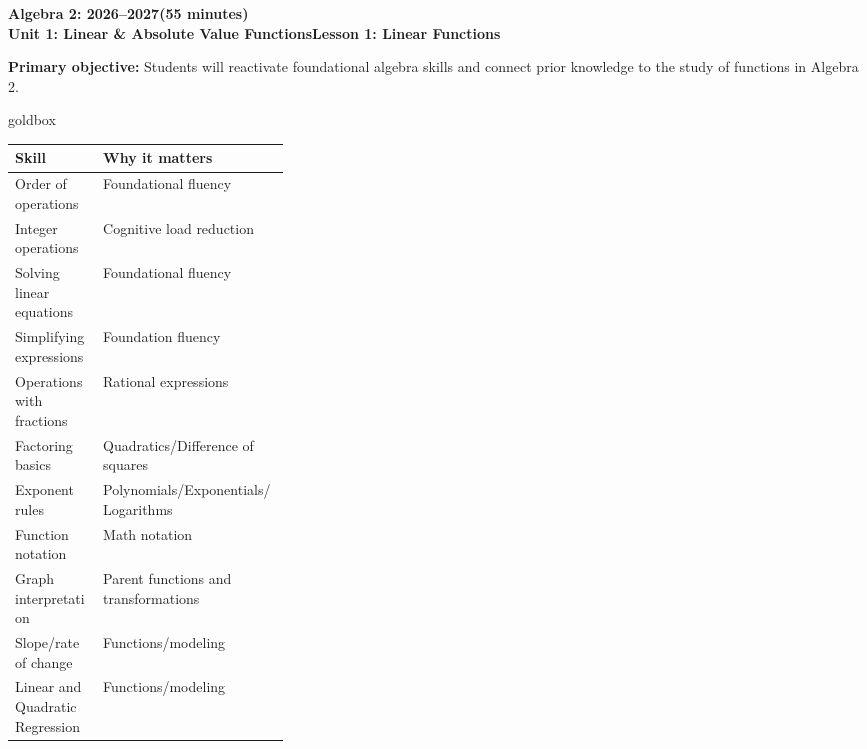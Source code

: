 \documentclass[10pt]{article}
\newcommand{\CourseName}{Algebra 2}
\newcommand{\SchoolYear}{2026--2027}
\newcommand{\MeetingLength}{55 minutes}
\newcommand{\UnitNumberName}{Unit 1: Linear \& Absolute Value Functions}
\newcommand{\LessonNumberName}{Lesson 1: Linear Functions }
\begin{document}
    \begin{center}
        {\Large\bfseries \CourseName: \SchoolYear (\MeetingLength) \\
        {\small \bfseries \UnitNumberName \LessonNumberName } }
    \end{center}

    \begin{tcolorbox}[colback=sky,colframe=navy,boxrule=0.9pt,arc=2mm,left=2mm,right=2mm,top=1.5mm,bottom=1.5mm]
        \textbf{Primary objective:} Students will reactivate foundational algebra skills and connect prior knowledge to the study of functions in Algebra 2.
    \end{tcolorbox}

    \renewcommand{\arraystretch}{1.6}
    \begin{skillbox}{goldbox}
    \renewcommand{\arraystretch}{1.6}
    \begin{tabularx}{\linewidth}{C{0.32\linewidth} Y}
    \textbf{Skill} & \textbf{Why it matters} \\
    \hline
    Order of operations & Foundational fluency \\ \hline
    Integer operations & Cognitive load reduction \\ \hline
    Solving linear equations & Foundational fluency \\ \hline
    Simplifying expressions & Foundation fluency \\ \hline
    Operations with fractions & Rational expressions \\ \hline
    Factoring basics & Quadratics/Difference of squares \\ \hline
    Exponent rules & Polynomials/Exponentials/Logarithms \\ \hline
    Function notation & Math notation \\ \hline
    Graph interpretation & Parent functions and transformations \\ \hline
    Slope/rate of change & Functions/modeling \\ \hline
    Linear and Quadratic Regression & Functions/modeling \\
    \end{tabularx}
    \end{skillbox}




    \renewcommand{\arraystretch}{1.6}
\end{document}
